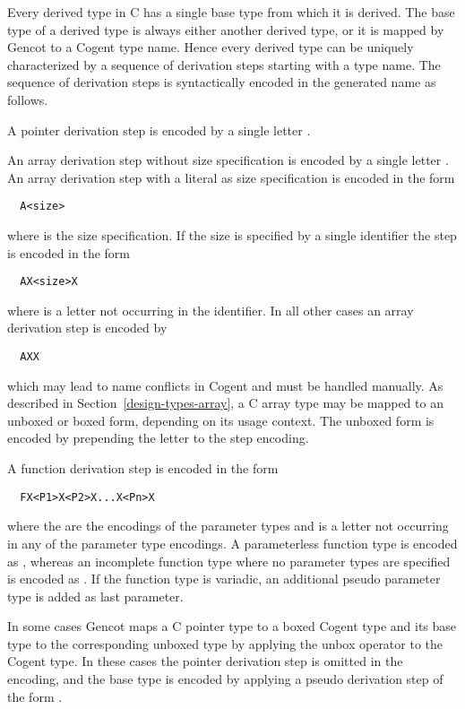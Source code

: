 Every derived type in C has a single base type from which it is derived. The base type of a derived
type is always either another derived type, or it is mapped by Gencot to a Cogent type name. Hence every derived 
type can be uniquely characterized by a sequence of derivation steps starting with a type name. The sequence of 
derivation steps is syntactically encoded in the generated name as follows.

A pointer derivation step is encoded by a single letter . 

An array derivation step without size
specification is encoded by a single letter . An array derivation step with a literal
as size specification is encoded in the form
\begin{verbatim}
  A<size>
\end{verbatim}
where  is the size specification. If the size is specified by a single identifier the 
step is encoded in the form
\begin{verbatim}
  AX<size>X
\end{verbatim}
where  is a letter not occurring in the identifier.
In all other cases an array derivation step is encoded by
\begin{verbatim}
  AXX
\end{verbatim}
which may lead to name conflicts in Cogent and must be handled manually. As described in 
Section~\ref{design-types-array}, a C array type may be mapped to an unboxed or boxed form, depending
on its usage context. The unboxed form is encoded by prepending the letter  to the step
encoding.

A function derivation step is encoded in the form
\begin{verbatim}
  FX<P1>X<P2>X...X<Pn>X
\end{verbatim}
where the  are the encodings of the parameter types and  is a letter not occurring in 
any of the parameter type encodings. A parameterless function type is encoded as , whereas an
incomplete function type where no parameter types are specified is encoded as .
If the function type is variadic, an additional pseudo parameter type 
is added as last parameter. 

In some cases Gencot maps a C pointer type to a boxed Cogent type and its base type to the corresponding
unboxed type by applying the unbox operator \code{\#} to the Cogent type. In these cases the pointer derivation
step is omitted in the encoding, and the base type is encoded by applying a pseudo derivation step 
of the form .

